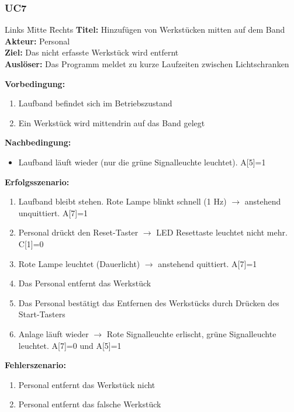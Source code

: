 \documentclass[oneside,a4paper,titlepage]{scrartcl} %
\begin{document}
\subsubsection{UC7}
\begin{tabbing}
 Links \= Mitte \= Rechts \kill
 \textbf{Titel:} \> \> Hinzufügen von Werkstücken mitten auf dem Band\\
 \textbf{Akteur:} \> \> Personal\\
 \textbf{Ziel:} \> \> Das nicht erfasste Werkstück wird entfernt\\
 \textbf{Auslöser:} \> \> Das Programm meldet zu kurze Laufzeiten zwischen Lichtschranken\\
\end{tabbing}
\textbf{Vorbedingung:}
\begin{enumerate}
 \item Laufband befindet sich im Betriebszustand
 \item Ein Werkstück wird mittendrin auf das Band gelegt
\end{enumerate}
\textbf{Nachbedingung:}
\begin{itemize}
 \item Laufband läuft wieder (nur die grüne Signalleuchte leuchtet). A[5]=1
\end{itemize}

\textbf{Erfolgsszenario:}
\begin{enumerate}
 \item Laufband bleibt stehen. Rote Lampe blinkt schnell (1 Hz) $\rightarrow$ anstehend unquittiert. A[7]=1
 \item Personal drückt den Reset-Taster $\rightarrow$ LED Resettaste leuchtet nicht mehr. C[1]=0
 \item Rote Lampe leuchtet (Dauerlicht) $\rightarrow$ anstehend quittiert. A[7]=1
 \item Das Personal entfernt das Werkstück
 \item Das Personal bestätigt das Entfernen des Werkstücks durch Drücken des Start-Tasters
 \item Anlage läuft wieder $\rightarrow$ Rote Signalleuchte erlischt, grüne Signalleuchte leuchtet. A[7]=0 und A[5]=1
\end{enumerate}
\textbf{Fehlerszenario:}
\begin{enumerate}
    \item Personal entfernt das Werkstück nicht
    \item Personal entfernt das falsche Werkstück
\end{enumerate}
\end{document}
